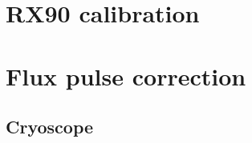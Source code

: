 \section{RX90 calibration}

\section{Flux pulse correction}
\subsection{Cryoscope}
\cite{rol_time-domain_2020}
\begin{comment}
    TO DO LIST:
    * calcoli analitic per assunzioni del cryoscope
    * calcoli analitici di convoluzioni per dimostrare che è giusto il modo in cui combiniamo i filtri
    * costruire script per analisi dati
    * eventualmente provare ad aggiungere più correzioni esponenziali
\end{comment}
